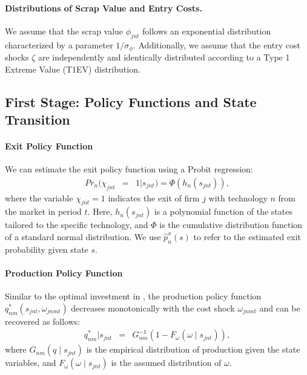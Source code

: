\documentclass[12pt, letter]{article}
\begin{document}
\paragraph{Distributions of Scrap Value and Entry Costs.} 
We assume that the scrap value $\phi_{jnt}$ follows an exponential distribution characterized by a parameter $1/\sigma_{\phi}$. %
Additionally, we assume that the entry cost shocks $\zeta$ are independently and identically distributed according to a Type 1 Extreme Value (T1EV) distribution.

\subsection{First Stage: Policy Functions and State Transition}
\label{subsec:est_dynamic_first}

\paragraph{Exit Policy Function} 
We can estimate the exit policy function using a Probit regression:
\begin{eqnarray}
     Pr_n(\chi_{jnt} &=&1|s_{jnt})=\Phi(h_n(s_{jnt})), \label{eq:est_exit}
\end{eqnarray}
where the variable $\chi_{jnt}=1$ indicates the exit of firm $j$ with technology $n$ from the market in period $t$. Here, $h_n(s_{jnt})$ is a polynomial function of the states tailored to the specific technology, and $\Phi$ is the cumulative distribution function of a standard normal distribution. We use $\hat{p}^x_n(s)$ to refer to the estimated exit probability given state $s$.


\paragraph{Production Policy Function}
Similar to the optimal investment in \citet{bajari2007estimating}, the production policy function $q_{nm}^*(s_{jnt},\omega_{jnmt})$ decreases monotonically with the cost shock $\omega_{jnmt}$ and can be recovered as follows:
\begin{eqnarray}
q_{nm}^*|s_{jnt} &=& G_{nm}^{-1}(1-F_{\omega}(\omega\mid s_{jnt})), \label{eq:est_output_1}
\end{eqnarray}
where $G_{nm}(q\mid s_{jnt})$ is the empirical distribution of production given the state variables, and $F_{\omega}(\omega\mid s_{jnt})$ is the assumed distribution of $\omega$.
\end{document}
